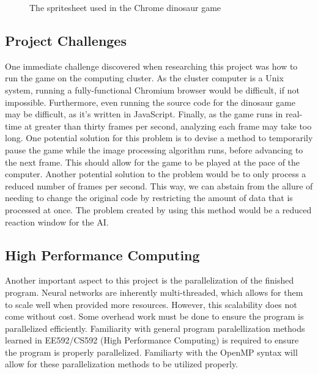 \begin{figure}\label{fig:dinosprites}
	\caption{The spritesheet used in the Chrome dinosaur game}
\end{figure}

\subsection{Project Challenges}\label{subsec:proj_challenges}
One immediate challenge discovered when researching this project was how to run the game on the computing cluster. As the cluster computer is a Unix system, running a fully-functional Chromium browser would be difficult, if not impossible. Furthermore, even running the source code for the dinosaur game may be difficult, as it's written in JavaScript. Finally, as the game runs in real-time at greater than thirty frames per second, analyzing each frame may take too long. One potential solution for this problem is to devise a method to temporarily pause the game while the image processing algorithm runs, before advancing to the next frame. This should allow for the game to be played at the pace of the computer. Another potential solution to the problem would be to only process a reduced number of frames per second. This way, we can abstain from the allure of needing to change the original code by restricting the amount of data that is processed at once. The problem created by using this method would be a reduced reaction window for the AI.

\subsection{High Performance Computing}\label{subsec:HPC}
Another important aspect to this project is the parallelization of the finished program. Neural networks are inherently multi-threaded, which allows for them to scale well when provided more resources. However, this scalability does not come without cost. Some overhead work must be done to ensure the program is parallelized efficiently. Familiarity with general program paralellization methods learned in EE592/CS592 (High Performance Computing) is required to ensure the program is properly parallelized. Familiarty with the OpenMP syntax will allow for these parallelization methods to be utilized properly.

